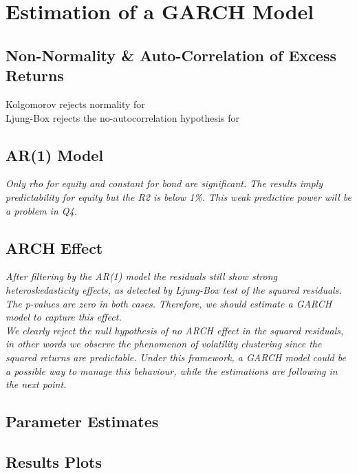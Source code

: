 \chapter{Estimation of a GARCH Model}

\section{Non-Normality \& Auto-Correlation of Excess Returns}

Kolgomorov rejects normality for\\
Ljung-Box rejects the no-autocorrelation hypothesis for

\section{AR(1) Model}
\textit{Only rho for equity and constant for bond are significant. The results imply
predictability for equity but the R2 is below 1\%. This weak predictive power will be a
problem in Q4.}

\section{ARCH Effect}
\textit{After filtering by the AR(1) model the residuals still show strong heteroskedasticity effects, as detected by Ljung-Box test of the squared residuals. The p-values are zero in both cases. Therefore, we should estimate a GARCH model to
capture this effect.}\\
\textit{We clearly reject the null hypothesis of no ARCH effect in the squared residuals, in other words we observe the phenomenon of volatility clustering since the squared returns are predictable. Under this framework, a GARCH model could be a possible way to manage this behaviour, while the estimations are following in the next point.}

\section{Parameter Estimates}

\section{Results Plots}

